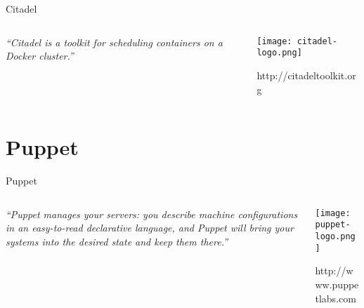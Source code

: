 \documentclass[presentation]{beamer}
\begin{document}
{
\begin{frame}[label=sec-5-2]{Citadel}

\begin{columns}
\begin{column}{0.6\textwidth}

\textit{``Citadel is a toolkit for scheduling containers on a Docker cluster.''}
\end{column}

\begin{column}{0.4\textwidth}
\texttt{[image: citadel-logo.png]}

\small{http://citadeltoolkit.org}
\end{column}
\end{columns}
\end{frame}} %

\section{Puppet}
\label{sec-6}

\begin{frame}[label=sec-6-1]{Puppet}
\begin{columns}
\begin{column}{0.6\textwidth}

\textit{``Puppet manages your servers: you describe machine configurations in an easy-to-read declarative language, and Puppet will bring your systems into the desired state and keep them there.''}
\end{column}

\begin{column}{0.4\textwidth}
\texttt{[image: puppet-logo.png]}

\small{http://www.puppetlabs.com}
\end{column}
\end{columns}
\end{frame}
\end{document}
